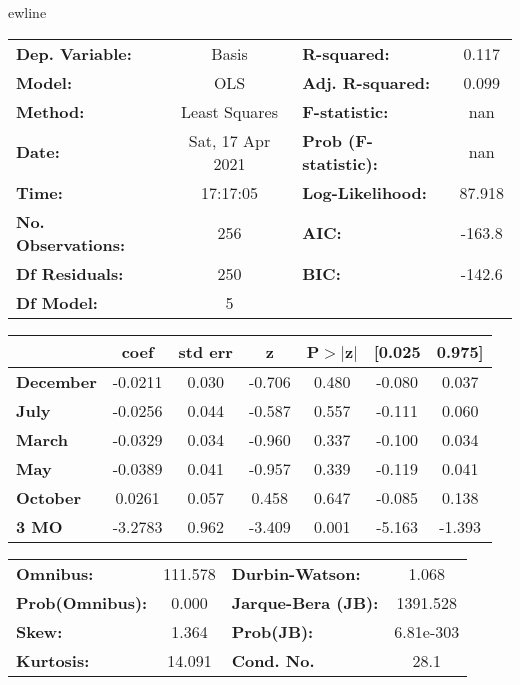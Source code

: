 ewline\begin{center}
\begin{tabular}{lclc}
\toprule
\textbf{Dep. Variable:}    &      Basis       & \textbf{  R-squared:         } &     0.117   \\
\textbf{Model:}            &       OLS        & \textbf{  Adj. R-squared:    } &     0.099   \\
\textbf{Method:}           &  Least Squares   & \textbf{  F-statistic:       } &       nan   \\
\textbf{Date:}             & Sat, 17 Apr 2021 & \textbf{  Prob (F-statistic):} &      nan    \\
\textbf{Time:}             &     17:17:05     & \textbf{  Log-Likelihood:    } &    87.918   \\
\textbf{No. Observations:} &         256      & \textbf{  AIC:               } &    -163.8   \\
\textbf{Df Residuals:}     &         250      & \textbf{  BIC:               } &    -142.6   \\
\textbf{Df Model:}         &           5      & \textbf{                     } &             \\
\bottomrule
\end{tabular}
\begin{tabular}{lcccccc}
                  & \textbf{coef} & \textbf{std err} & \textbf{z} & \textbf{P$> |$z$|$} & \textbf{[0.025} & \textbf{0.975]}  \\
\midrule
\textbf{December} &      -0.0211  &        0.030     &    -0.706  &         0.480        &       -0.080    &        0.037     \\
\textbf{July}     &      -0.0256  &        0.044     &    -0.587  &         0.557        &       -0.111    &        0.060     \\
\textbf{March}    &      -0.0329  &        0.034     &    -0.960  &         0.337        &       -0.100    &        0.034     \\
\textbf{May}      &      -0.0389  &        0.041     &    -0.957  &         0.339        &       -0.119    &        0.041     \\
\textbf{October}  &       0.0261  &        0.057     &     0.458  &         0.647        &       -0.085    &        0.138     \\
\textbf{3 MO}     &      -3.2783  &        0.962     &    -3.409  &         0.001        &       -5.163    &       -1.393     \\
\bottomrule
\end{tabular}
\begin{tabular}{lclc}
\textbf{Omnibus:}       & 111.578 & \textbf{  Durbin-Watson:     } &     1.068  \\
\textbf{Prob(Omnibus):} &   0.000 & \textbf{  Jarque-Bera (JB):  } &  1391.528  \\
\textbf{Skew:}          &   1.364 & \textbf{  Prob(JB):          } & 6.81e-303  \\
\textbf{Kurtosis:}      &  14.091 & \textbf{  Cond. No.          } &      28.1  \\
\bottomrule
\end{tabular}
\end{center}


